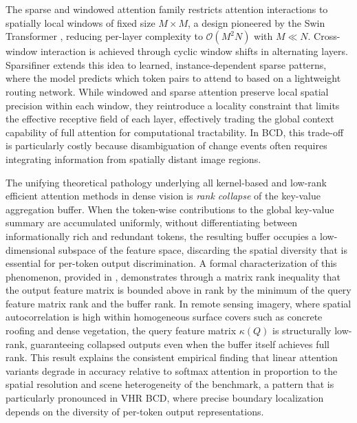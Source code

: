 The sparse and windowed attention family restricts attention interactions to spatially local windows of fixed size $M \times M$, a design pioneered by the Swin Transformer \cite{Liu2021Swin}, reducing per-layer complexity to $\mathcal{O}(M^2 N)$ with $M \ll N$. Cross-window interaction is achieved through cyclic window shifts in alternating layers. Sparsifiner \cite{Wei2023Sparsifiner} extends this idea to learned, instance-dependent sparse patterns, where the model predicts which token pairs to attend to based on a lightweight routing network. While windowed and sparse attention preserve local spatial precision within each window, they reintroduce a locality constraint that limits the effective receptive field of each layer, effectively trading the global context capability of full attention for computational tractability. In \ac{BCD}, this trade-off is particularly costly because disambiguation of change events often requires integrating information from spatially distant image regions.

The unifying theoretical pathology underlying all kernel-based and low-rank efficient attention methods in dense vision is \emph{rank collapse} of the key-value aggregation buffer. When the token-wise contributions to the global key-value summary are accumulated uniformly, without differentiating between informationally rich and redundant tokens, the resulting buffer occupies a low-dimensional subspace of the feature space, discarding the spatial diversity that is essential for per-token output discrimination. A formal characterization of this phenomenon, provided in \cite{Fan2025RALA}, demonstrates through a matrix rank inequality that the output feature matrix is bounded above in rank by the minimum of the query feature matrix rank and the buffer rank. In remote sensing imagery, where spatial autocorrelation is high within homogeneous surface covers such as concrete roofing and dense vegetation, the query feature matrix $\kappa(Q)$ is structurally low-rank, guaranteeing collapsed outputs even when the buffer itself achieves full rank. This result explains the consistent empirical finding that linear attention variants degrade in accuracy relative to softmax attention in proportion to the spatial resolution and scene heterogeneity of the benchmark, a pattern that is particularly pronounced in \ac{VHR} \ac{BCD}, where precise boundary localization depends on the diversity of per-token output representations.


